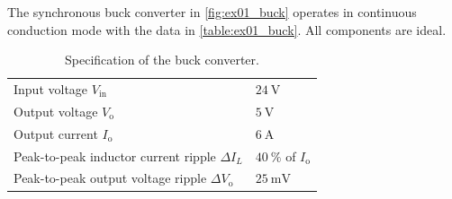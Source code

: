 


The synchronous buck converter in \autoref{fig:ex01_buck} operates in continuous conduction mode with the data in \autoref{table:ex01_buck}. All components are ideal.



\begin{table}[ht]
	\centering
	\begin{tabular}{ll}
		\toprule
		Input voltage $V_\mathrm{in}$                       & $\SI{24}{\volt}$                       \\
		Output voltage $V_\mathrm{o}$                       & $\SI{5}{\volt}$                        \\
		Output current $I_\mathrm{o}$                       & $\SI{6}{\ampere}$                      \\
		Peak-to-peak inductor current ripple $\Delta I_L$   & $\SI{40}{\percent}$ of $I_\mathrm{o}$  \\
		Peak-to-peak output voltage ripple $\Delta V_\mathrm{o}$ & $\SI{25}{\milli\volt}$            \\
		\bottomrule
	\end{tabular}
	\caption{Specification of the buck converter.}
	\label{table:ex01_buck}
\end{table}


